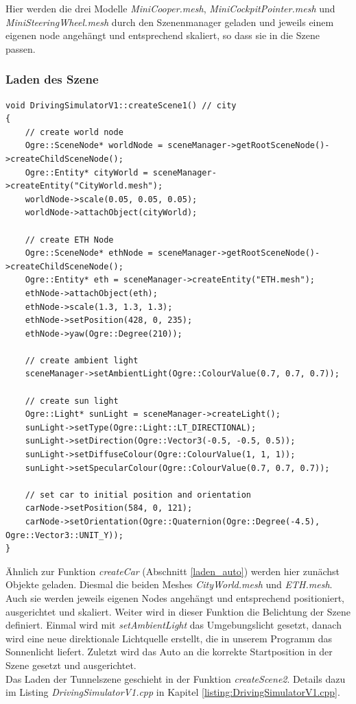 Hier werden die drei Modelle \textit{MiniCooper.mesh}, \textit{MiniCockpitPointer.mesh} und \textit{MiniSteeringWheel.mesh} durch den Szenenmanager geladen und jeweils einem eigenen \gls{node} angehängt und entsprechend skaliert, so dass sie in die Szene passen.

\subsubsection{Laden des Szene}

\begin{lstlisting}[caption={Laden der Szene},label={laden_szene}]
void DrivingSimulatorV1::createScene1() // city
{
	// create world node
	Ogre::SceneNode* worldNode = sceneManager->getRootSceneNode()->createChildSceneNode();
	Ogre::Entity* cityWorld = sceneManager->createEntity("CityWorld.mesh");
	worldNode->scale(0.05, 0.05, 0.05);
	worldNode->attachObject(cityWorld);

	// create ETH Node
	Ogre::SceneNode* ethNode = sceneManager->getRootSceneNode()->createChildSceneNode();
	Ogre::Entity* eth = sceneManager->createEntity("ETH.mesh");
	ethNode->attachObject(eth);
	ethNode->scale(1.3, 1.3, 1.3);
	ethNode->setPosition(428, 0, 235);
	ethNode->yaw(Ogre::Degree(210));

	// create ambient light
	sceneManager->setAmbientLight(Ogre::ColourValue(0.7, 0.7, 0.7));

	// create sun light
	Ogre::Light* sunLight = sceneManager->createLight();
	sunLight->setType(Ogre::Light::LT_DIRECTIONAL);
	sunLight->setDirection(Ogre::Vector3(-0.5, -0.5, 0.5));
	sunLight->setDiffuseColour(Ogre::ColourValue(1, 1, 1));
	sunLight->setSpecularColour(Ogre::ColourValue(0.7, 0.7, 0.7));

	// set car to initial position and orientation
	carNode->setPosition(584, 0, 121);
	carNode->setOrientation(Ogre::Quaternion(Ogre::Degree(-4.5), Ogre::Vector3::UNIT_Y));
}
\end{lstlisting}

Ähnlich zur Funktion \textit{createCar} (Abschnitt \ref{laden_auto}) werden hier zunächst Objekte geladen. Diesmal die beiden Meshes \textit{CityWorld.mesh} und \textit{ETH.mesh}. Auch sie werden jeweils eigenen Nodes angehängt und entsprechend positioniert, ausgerichtet und skaliert. Weiter wird in dieser Funktion die Belichtung der Szene definiert. Einmal wird mit \textit{setAmbientLight} das Umgebungslicht gesetzt, danach wird eine neue direktionale Lichtquelle erstellt, die in unserem Programm das Sonnenlicht liefert. Zuletzt wird das Auto an die korrekte Startposition in der Szene gesetzt und ausgerichtet.\\Das Laden der Tunnelszene geschieht in der Funktion \textit{createScene2}. Details dazu im Listing \textit{DrivingSimulatorV1.cpp} in Kapitel \ref{listing:DrivingSimulatorV1.cpp}.

